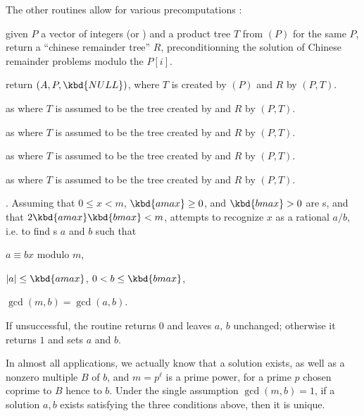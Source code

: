 The other routines allow for various precomputations :

 given $P$ a vector of integers
(or ) and a product tree $T$ from $(P)$
for the same $P$, return a ``chinese remainder tree'' $R$, preconditionning
the solution of Chinese remainder problems modulo the $P[i]$.

return $(A,P,\kbd{NULL})$, where $T$ is created by
$(P)$ and $R$ by $(P,T)$.

as  where $T$ is assumed to be the tree created by
 and $R$ by $(P,T)$.

as  where $T$ is assumed to be the tree created by
 and $R$ by $(P,T)$.

as  where $T$ is assumed to be the tree created by
 and $R$ by $(P,T)$.

as  where $T$ is assumed to be the tree created by
 and $R$ by $(P,T)$.


.
Assuming that $0 \leq x < m$, $\kbd{amax} \geq 0$, and
$\kbd{bmax} > 0$ are s, and that $2 \kbd{amax} \kbd{bmax} < m$,
attempts to recognize $x$ as a rational $a/b$, i.e. to find s $a$
and $b$ such that

\item $a \equiv b x$ modulo $m$,

\item $|a| \leq \kbd{amax}$, $0 < b \leq \kbd{bmax}$,

\item $\gcd(m,b) = \gcd(a,b)$.

\noindent If unsuccessful, the routine returns $0$ and leaves $a$, $b$
unchanged; otherwise it returns $1$ and sets $a$ and $b$.

In almost all applications, we actually know that a solution exists, as well
as a nonzero multiple $B$ of $b$, and $m = p^\ell$ is a prime power, for a
prime $p$ chosen coprime to $B$ hence to $b$. Under the single assumption
$\gcd(m,b) = 1$, if a solution $a,b$ exists satisfying the three conditions
above, then it is unique.

